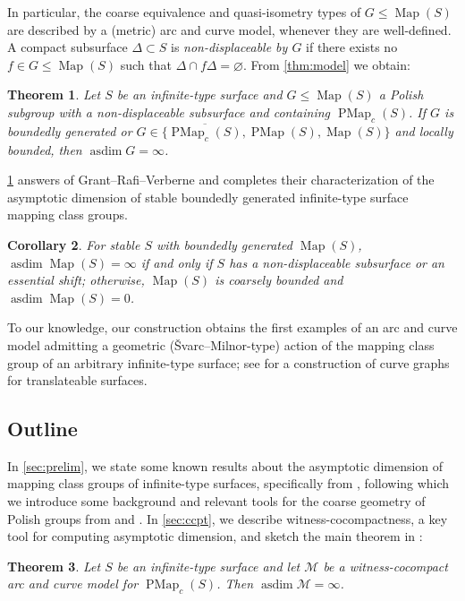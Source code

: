 \documentclass[twoside]{amsart}
\theoremstyle{plain}
\newtheorem{theorem}{Theorem}[section]
\newtheorem{corollary}[theorem]{Corollary}
\theoremstyle{break}
\theoremstyle{definition}
\theoremstyle{remark}
\DeclareMathOperator{\Map}{Map}
\DeclareMathOperator{\asdim}{asdim}
\DeclareMathOperator{\PMap}{PMap}
\begin{document}
In particular, the coarse equivalence and quasi-isometry types of
$G \leq \Map(S)$ are described by a (metric) arc and curve model, whenever
they are
well-defined. A compact subsurface $\Delta \subset S$ 
is \textit{non-displaceable by $G$} if
there exists no $f \in G \leq \Map(S)$ such that
$\Delta \cap f\Delta = \varnothing$.  
From \cref{thm:model} we obtain: 

\begin{theorem}\label{thm:asdim}
 Let $S$ be an infinite-type surface and $G\leq \Map(S)$ a Polish
 subgroup  with a
 non-displaceable subsurface and containing $\PMap_c(S)$. If
 $G$ is boundedly generated or $G \in \{\overline{\PMap_c(S)},
 \PMap(S),\Map(S) \}$ and locally bounded, then $\asdim G = \infty$. 
\end{theorem}

\cref{thm:asdim} answers 
\cite[Qn.~1.8]{shift} of Grant--Rafi--Verberne 
 and completes their characterization of 
the asymptotic dimension of stable boundedly generated
infinite-type surface mapping class groups.

\begin{corollary}\label{cor:asdim}
  For stable $S$ with boundedly generated $\Map(S)$, 
  $\asdim \Map(S) = \infty$ if and
  only if $S$ has a non-displaceable subsurface or an essential
  shift; otherwise, $\Map(S)$ is coarsely bounded and $\asdim \Map(S)
  = 0$.
\end{corollary}

To our knowledge, our construction obtains the first examples of an
arc and curve model
admitting a geometric (\v Svarc--Milnor-type) action of the
mapping class group of an arbitrary infinite-type surface; see
\cite{anschel} for a construction of curve graphs for translateable
surfaces. 

\subsection{Outline}\label{sec:outline}

In \cref{sec:prelim}, we state some known results about the
asymptotic dimension of mapping class groups of infinite-type
surfaces, specifically from \cite{shift}, following which we
introduce some background and relevant tools for the coarse
geometry of Polish groups from \cite{rosendal} and \cite{bdhl}. 
In \cref{sec:ccpt}, we describe witness-cocompactness, a key tool for
computing asymptotic dimension, and sketch the main theorem in
\cite{ga_asdim}: 

\begin{theorem}\label{thm:ccpt_asdim} Let $S$ be an
  infinite-type surface and let 
  $\mathcal{M}$ be a witness-cocompact arc and curve model for
  $\PMap_c(S)$.
  Then $\asdim \mathcal{M} = \infty$. 
\end{theorem}
\end{document}
